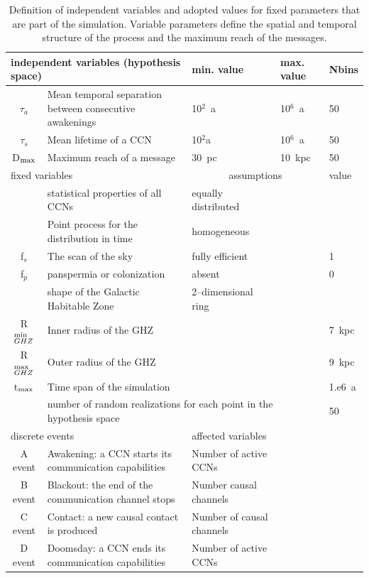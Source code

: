 \documentclass[crop]{CSLB}
\newcommand{\ceti}{CCN}
\newcommand{\cetis}{CCNs}
\begin{document}
 \setlength{\tabcolsep}{10pt}
\begin{table}
\centering
\begin{tabular}{cllll}
\hline
   \multicolumn{2}{l}{independent variables (hypothesis space)}
   &min. value&max. value&Nbins\\
\hline
   $\tau_{a}$ & Mean temporal separation between consecutive
   awakenings & 10$^2$~a & 10$^6$~a & 50\\ 
   $\tau_{s}$ & Mean lifetime of a \ceti{}
   & 10$^2$a & 10$^6$~a& 50\\ 
   D$_{\rm max}$ & Maximum reach of a message  & 30~pc & 10~kpc & 50 \\
\hline
   \multicolumn{2}{l}{fixed variables} & \multicolumn{2}{c}{assumptions} &value \\
\hline
   & statistical properties of all \cetis{} &equally distributed&&\\
   & Point process for the distribution in time & homogeneous &&\\
   f$_s$ & The scan of the sky & fully efficient&&1\\
   f$_p$ & panspermia or colonization &absent&&0\\
   & shape of the Galactic Habitable Zone & 2--dimensional ring &&\\
   R$_{GHZ}^{\rm min}$   & Inner radius of the GHZ     & & & 7~kpc\\
   R$_{GHZ}^{\rm max}$   & Outer radius of the GHZ     &&& 9~kpc\\
   t$_{\rm max}$ & Time span of the simulation  &&&1.e6~a\\
    & \multicolumn{3}{l}{number of random realizations for each point in the hypothesis space} &50\\
\hline
   \multicolumn{2}{l}{discrete events} &
   \multicolumn{3}{l}{affected variables}\\
\hline
   A event & Awakening: a \ceti{} starts its communication
   capabilities &Number of active \cetis{}\\
   B event & Blackout: the end of the communication channel stops
   &Number causal channels\\
   C event & Contact: a new causal contact is produced &Number of causal channels\\
   D event & Doomsday: a \ceti{} ends its communication capabilities&Number of active \cetis{}\\
\hline

\hline
\end{tabular}
\caption{Definition of independent variables and adopted values for 
   fixed parameters 
   that are part of the simulation.  Variable parameters define the
   spatial and temporal structure
   of the process and the maximum reach of the messages.}
\label{T_simu_hypotheses}
\end{table}
 
\end{document}

